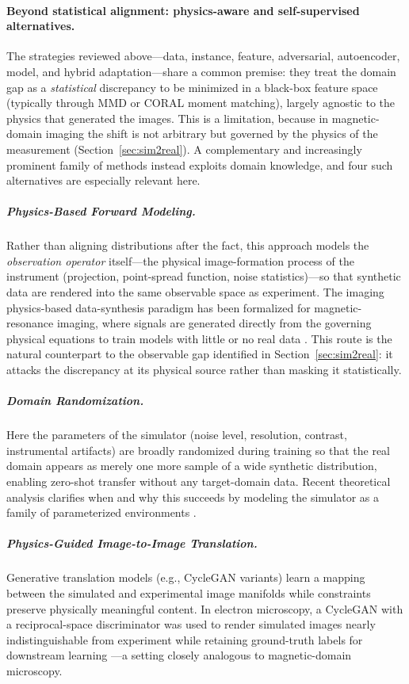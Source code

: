\documentclass[letterpaper, 12, one column]{article}
\begin{document}
\paragraph{Beyond statistical alignment: physics-aware and self-supervised alternatives.}
The strategies reviewed above---data, instance, feature, adversarial, autoencoder, model, and hybrid adaptation---share a common premise: they treat the domain gap as a \emph{statistical} discrepancy to be minimized in a black-box feature space (typically through MMD or CORAL moment matching), largely agnostic to the physics that generated the images. This is a limitation, because in magnetic-domain imaging the shift is not arbitrary but governed by the physics of the measurement (Section~\ref{sec:sim2real}). A complementary and increasingly prominent family of methods instead exploits domain knowledge, and four such alternatives are especially relevant here.

\subparagraph{Physics-Based Forward Modeling.} Rather than aligning distributions after the fact, this approach models the \emph{observation operator} itself---the physical image-formation process of the instrument (projection, point-spread function, noise statistics)---so that synthetic data are rendered into the same observable space as experiment. The imaging physics-based data-synthesis paradigm has been formalized for magnetic-resonance imaging, where signals are generated directly from the governing physical equations to train models with little or no real data \cite{yang2023physics}. This route is the natural counterpart to the observable gap identified in Section~\ref{sec:sim2real}: it attacks the discrepancy at its physical source rather than masking it statistically.

\subparagraph{Domain Randomization.} Here the parameters of the simulator (noise level, resolution, contrast, instrumental artifacts) are broadly randomized during training so that the real domain appears as merely one more sample of a wide synthetic distribution, enabling zero-shot transfer without any target-domain data. Recent theoretical analysis clarifies when and why this succeeds by modeling the simulator as a family of parameterized environments \cite{chen2022understanding}.

\subparagraph{Physics-Guided Image-to-Image Translation.} Generative translation models (e.g., CycleGAN variants) learn a mapping between the simulated and experimental image manifolds while constraints preserve physically meaningful content. In electron microscopy, a CycleGAN with a reciprocal-space discriminator was used to render simulated images nearly indistinguishable from experiment while retaining ground-truth labels for downstream learning \cite{khan2023leveraging}---a setting closely analogous to magnetic-domain microscopy.
\end{document}
